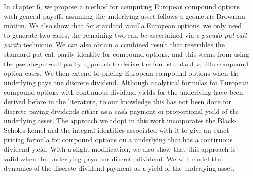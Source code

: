 		In chapter 6, we propose a method for computing European compound options with general payoffs assuming the underlying asset follows a geometric Brownian motion. We also show that for standard vanilla European options, we only need to generate two cases; the remaining two can be ascertained via a \emph{pseudo-put-call parity} technique. We can also obtain a combined result that resembles the standard put-call parity identity for compound options, and this stems from using the pseudo-put-call parity approach to derive the four standard vanilla compound option cases. We then extend to pricing European compound options when the underlying pays one discrete dividend. Although analytical formulas for European compound options with continuous dividend yields for the underlying have been derived before in the literature, to our knowledge this has not been done for discrete paying dividends either as a cash payment or proportional yield of the underlying asset. The approach we adopt in this work incorporates the Black-Scholes kernel and the integral identities associated with it to give an exact pricing formula for compound options on a underlying that has a continuous dividend yield. With a slight modification, we also show that this approach is valid when the underlying pays one discrete dividend. We will model the dynamics of the discrete dividend payment as a yield of the underlying asset.
